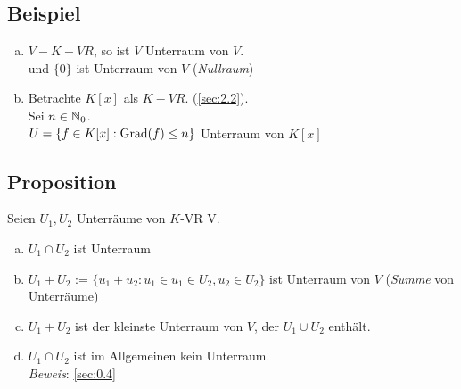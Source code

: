 \subsection{Beispiel}
\begin{enumerate}[a)]
\item$V-K-VR$, so ist $V$ Unterraum von $V$.\\
und $\{0\}$ ist Unterraum von $V$ (\emph{Nullraum})
\item Betrachte $K[x]$ als $K-VR$. (\ref{sec:2.2}).\\
Sei $n \in \mathbb{N}_0$.\\
$U = \{ f \in K[x] : \operatorname{Grad}(f) \leq n \}$ Unterraum von $K[x]$
\end{enumerate}
\subsection{Proposition}
Seien $U_1,U_2$ Unterräume von $K$-VR V.
\begin{enumerate}[a)]
\item $U_1 \cap U_2$ ist Unterraum
\item $U_1 + U_2$ := $\{ u_1 + u_2 : u_1 \in u_1 \in U_2, u_2 \in U_2 \}$ ist Unterraum von $V$ (\emph{Summe} von Unterräume)
\item $U_1 + U_2$ ist der kleinste Unterraum von $V$, der $U_1 \cup U_2$ enthält.
\item $ U_1 \cap U_2$ ist im Allgemeinen kein Unterraum.\\
\emph{Beweis}: \ref{sec:0.4}
\end{enumerate} 
